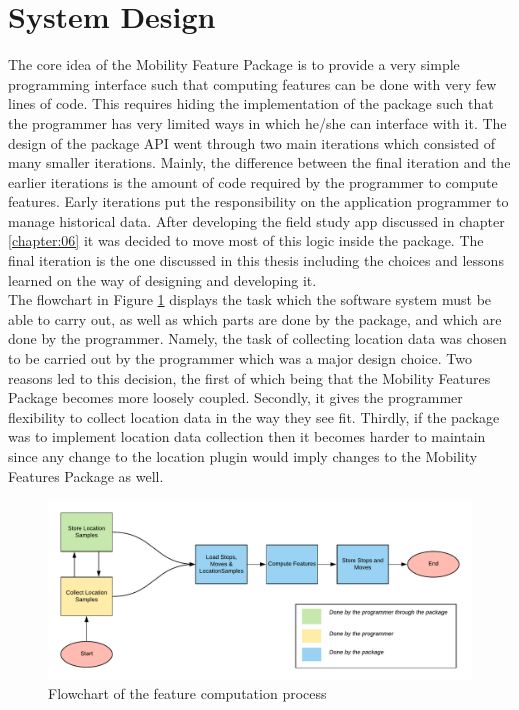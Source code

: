 \section{System Design}
The core idea of the Mobility Feature Package is to provide a very simple programming interface such that computing features can be done with very few lines of code. This requires hiding the implementation of the package such that the programmer has very limited ways in which he/she can interface with it. The design of the package API went through two main iterations which consisted of many smaller iterations. Mainly, the difference between the final iteration and the earlier iterations is the amount of code required by the programmer to compute features. Early iterations put the responsibility on the application programmer to manage historical data. After developing the field study app discussed in chapter \ref{chapter:06} it was decided to move most of this logic inside the package. The final iteration is the one discussed in this thesis including the choices and lessons learned on the way of designing and developing it.\\

The flowchart in Figure \ref{fig:flowchart-features} displays the task which the software system must be able to carry out, as well as which parts are done by the package, and which are done by the programmer. Namely, the task of collecting location data was chosen to be carried out by the programmer which was a major design choice. Two reasons led to this decision, the first of which being that the Mobility Features Package becomes more loosely coupled. Secondly, it gives the programmer flexibility to collect location data in the way they see fit. Thirdly, if the package was to implement location data collection then it becomes harder to maintain since any change to the location plugin would imply changes to the Mobility Features Package as well. 

\begin{figure}[h]
    \centering
    \includegraphics[width=\textwidth]{images/diagrams/flowchart.pdf}
    \caption{Flowchart of the feature computation process}
    \label{fig:flowchart-features}
\end{figure}


